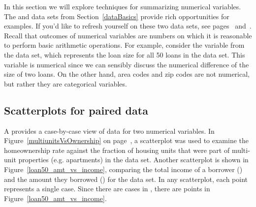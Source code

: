 In this section we will explore techniques for
summarizing numerical variables.
The  and  data sets from
Section~\ref{dataBasics} provide rich opportunities
for examples.
If you'd like to refresh yourself on these two data
sets, see pages~\pageref{loan50DF} and~\pageref{countyDF}.
Recall that outcomes of numerical variables are numbers
on which it is reasonable to perform basic arithmetic
operations.
For example, consider the
 variable
from the  data set,
which represents the loan size for all 50 loans
in the data set.
This variable is numerical since we can sensibly discuss
the numerical difference of the size of two loans.
On the other hand, area codes and zip codes are not numerical,
but rather they are categorical variables.


\subsection{Scatterplots for paired data}
\label{scatterPlots}


A  provides a case-by-case view of data
for two numerical variables.
In Figure~\vref{multiunitsVsOwnership} on
page~\pageref{multiunitsVsOwnership}, a scatterplot
was used to examine the homeownership rate against
the fraction of housing units that were part of
multi-unit properties
(e.g. apartments) in the  data set.
Another scatterplot is shown in Figure~\ref{loan50_amt_vs_income},
comparing the total income of a borrower
() and the amount they borrowed
() for the  data set.
In any scatterplot, each point represents a single case.
Since there are \loanN{} cases in ,
there are \loanN{} points in Figure~\ref{loan50_amt_vs_income}.


